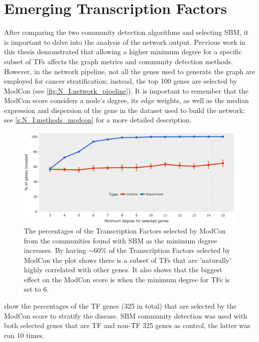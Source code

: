 
\section{Emerging Transcription Factors} \label{s:N_I:sel_tfs}

After comparing the two community detection algorithms and selecting SBM, it is important to delve into the analysis of the network output. Previous work in this thesis demonstrated that allowing a higher minimum degree for a specific subset of TFs affects the graph metrics and community detection methods. However, in the network pipeline, not all the genes used to generate the graph are employed for cancer stratification; instead, the top 100 genes are selected by ModCon (see \cref{fig:N_I:network_pipeline}). It is important to remember that the ModCon score considers a node’s degree, its edge weights, as well as the median expression and dispersion of the gene in the dataset used to build the network; see \cref{s:N_I:methods_modcon} for a more detailed description.


\begin{figure}[!b]   
    \centering
    \includegraphics[width=1.0\textwidth,height=1.0\textheight,keepaspectratio]{Sections/Network_I/Resources/selective_pruning/com_comp/ctrls_min_dig_mev.png}
      \caption{The percentages of the Transcription Factors selected by ModCon from the communities found with \gls{SBM} as the minimum degree increases. By having $\sim60\%$ of the Transcription Factors selected by ModCon the plot shows there is a subset of TFs that are 'naturally' highly correlated with other genes. It also shows that the biggest effect on the ModCon score is when the minimum degree for TFs is set to 6.}
    \label{fig:N_I:sel_tfs}
\end{figure}

 show the percentages of the TF genes (325 in total) that are selected by the ModCon score to stratify the disease. SBM community detection was used with both selected genes that are TF and non-TF 325 genes as control, the latter was run 10 times.

